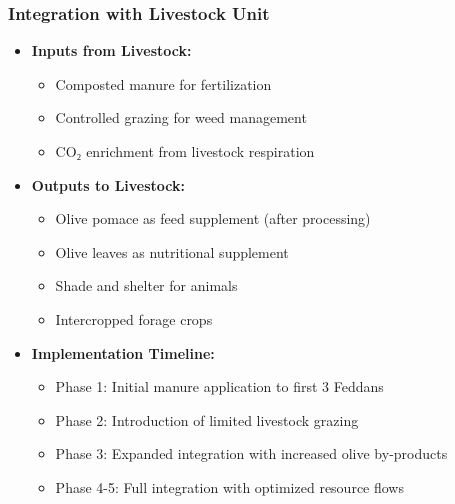 \subsubsection{Integration with Livestock Unit}
\begin{itemize}
    \item \textbf{Inputs from Livestock:}
    \begin{itemize}
        \item Composted manure for fertilization
        \item Controlled grazing for weed management
        \item CO₂ enrichment from livestock respiration
    \end{itemize}
    
    \item \textbf{Outputs to Livestock:}
    \begin{itemize}
        \item Olive pomace as feed supplement (after processing)
        \item Olive leaves as nutritional supplement
        \item Shade and shelter for animals
        \item Intercropped forage crops
    \end{itemize}
    
    \item \textbf{Implementation Timeline:}
    \begin{itemize}
        \item Phase 1: Initial manure application to first 3 Feddans
        \item Phase 2: Introduction of limited livestock grazing
        \item Phase 3: Expanded integration with increased olive by-products
        \item Phase 4-5: Full integration with optimized resource flows
    \end{itemize}
\end{itemize}

